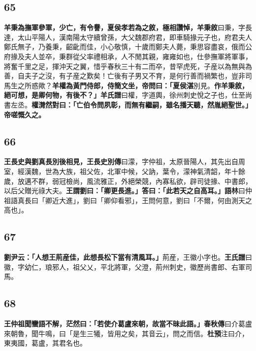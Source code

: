 \subsection*{65}

\textbf{羊秉為撫軍參軍，少亡，有令譽，夏侯孝若為之敘，極相讚悼，}{\footnotesize \textbf{羊秉敘}曰秉，字長達，太山平陽人，漢南陽太守續曾孫，大父魏郡府君，即車騎掾元子也，府君夫人鄭氏無子，乃養秉，齠齔而佳，小心敬慎，十歲而鄭夫人薨，秉思容盡哀，俄而公府掾及夫人並卒，秉群從父率禮相承，人不閒其親，雍雍如也，仕參撫軍將軍事，將奮千里之足，揮沖天之翼，惜乎春秋三十有二而卒，昔罕虎死，子産以為無與為善，自夫子之沒，有子産之歎矣！亡後有子男又不育，是何行善而禍繁也，豈非司馬生之所惑歟？}\textbf{羊權為黃門侍郎，侍簡文坐，帝問曰：「夏侯湛}{\footnotesize 別見。}\textbf{作羊秉敘，絕可想，是卿何物，有後不？」}{\footnotesize \textbf{羊氏譜}曰權，字道輿，徐州刺史悅之子也，仕至尚書左丞。}\textbf{權潸然對曰：「亡伯令問夙彰，而無有繼嗣，雖名播天聽，然胤絕聖世。」帝嗟慨久之。}

\subsection*{66}

\textbf{王長史與劉真長別後相見，}{\footnotesize \textbf{王長史別傳}曰濛，字仲祖，太原晉陽人，其先出自周室，經漢魏，世為大族，祖父佐，北軍中候，父訥，葉令，濛神氣清韶，年十餘歲，放邁不群，弱冠檢尚，風流雅正，外絕榮競，內寡私欲，辟司徒掾、中書郎，以后父贈光祿大夫。}\textbf{王謂劉曰：「卿更長進。」答曰：「此若天之自高耳。」}{\footnotesize \textbf{語林}曰仲祖語真長曰「卿近大進」，劉曰「卿仰看邪」，王問何意，劉曰「不爾，何由測天之高也」。}

\subsection*{67}

\textbf{劉尹云：「人想王荊産佳，此想長松下當有清風耳。」}{\footnotesize 荊産，王徽小字也。\textbf{王氏譜}曰徽，字幼仁，琅邪人，祖父乂，平北將軍，父澄，荊州刺史，徽歷尚書郎、右軍司馬。}

\subsection*{68}

\textbf{王仲祖聞蠻語不解，茫然曰：「若使介葛盧來朝，故當不昧此語。」}{\footnotesize \textbf{春秋傳}曰介葛盧來朝魯，聞牛鳴，曰「是生三犧，皆用之矣，其音云」，問之而信。\textbf{杜預}注曰介，東夷國，葛盧，其君名也。}

